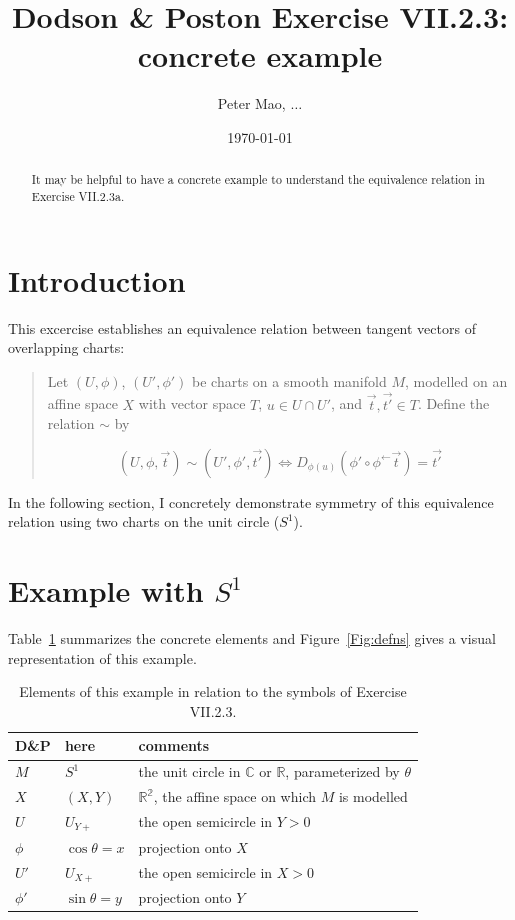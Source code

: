 \documentclass[11pt]{article}
\title{Dodson \& Poston Exercise VII.2.3: concrete example}
\author{Peter Mao, $\ldots$}
\date{\today}
\begin{document}
\maketitle
\pagestyle{empty}

\begin{abstract}
  It may be helpful to have a concrete example to understand the equivalence
  relation in Exercise VII.2.3a.
\end{abstract}

\section{Introduction}

This excercise establishes an equivalence relation between tangent vectors of
overlapping charts:

\begin{quote}
  Let $(U,\phi)$, $(U',\phi')$ be charts on a smooth manifold $M$, modelled on
  an affine space $X$ with vector space $T$, $u \in U \cap U'$, and $\vec{t},
  \vec{t'} \in T$. Define the relation $\sim$ by

  \[
  (U, \phi, \vec{t}) \sim (U', \phi', \vec{t'}) \iff D_{\phi(u)}(\phi' \circ
  \phi^{\leftarrow}\vec{t}) = \vec{t'}
  \]
\end{quote}

In the following section, I concretely demonstrate symmetry of this equivalence
relation using two charts on the unit circle ($S^1$).

\section{Example with $S^1$}

Table~\ref{Tbl:defns} summarizes the concrete elements and
Figure~\ref{Fig:defns} gives a visual representation of this example.


\begin{table}[h]
\begin{center}
\caption{Elements of this example in relation to the symbols of Exercise VII.2.3.}
\label{Tbl:defns}
\begin{tabular}{|l|l|l|} \hline
  D\&P & here & comments \\ \hline
  $M$ & $S^1$    & the unit circle in $\mathbb{C}$ or $\mathbb{R}$, parameterized by $\theta$ \\
  $X$ & $(X, Y)$ & $\mathbb{R^2}$, the affine space on which $M$ is modelled \\
  $U$ & $U_{Y+}$ & the open semicircle in $Y > 0$ \\
  $\phi$ & $\cos\theta = x$ & projection onto $X$\\
  $U'$ & $U_{X+}$ & the open semicircle in $X > 0$ \\
  $\phi'$ & $\sin\theta = y$ & projection onto $Y$\\ \hline
\end{tabular}
\end{center}
\end{table}
\end{document}
